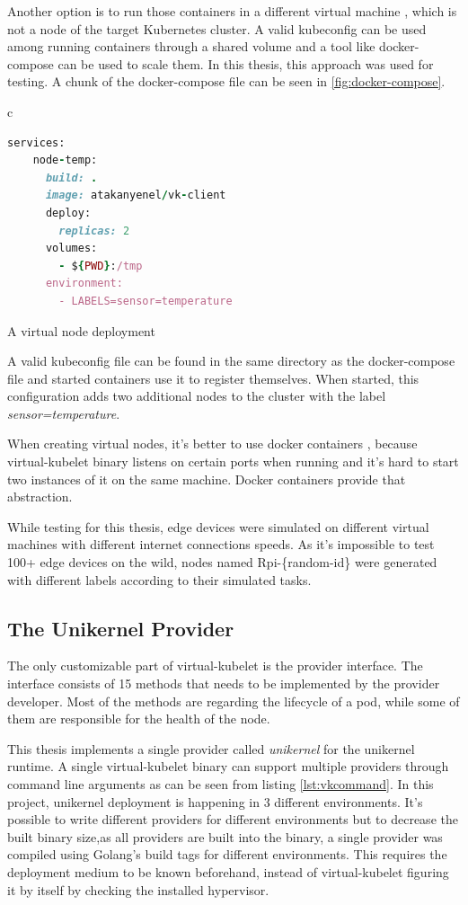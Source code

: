 Another option is to run those containers in a different virtual machine , which is not a node of the target Kubernetes cluster. A valid kubeconfig can be used among running containers through a shared volume and a tool like docker-compose can be used to scale them. In this thesis, this approach was used for testing. A chunk of the docker-compose file can be seen in \ref{fig:docker-compose}.

\begin{code}[htpb]
  \centering
  \begin{tabular}{c}
  \begin{lstlisting}[language=ruby]
    services:
    node-temp:
      build: .
      image: atakanyenel/vk-client
      deploy:
        replicas: 2
      volumes:
        - ${PWD}:/tmp
      environment:
        - LABELS=sensor=temperature
\end{lstlisting}
\end{tabular}
\caption{A virtual node deployment}\label{fig:docker-compose}
\end{code}


A valid kubeconfig file can be found in the same directory as the docker-compose file and started containers use it to register themselves. When started, this configuration adds two additional nodes to the cluster with the label \textit{sensor=temperature}.

When creating virtual nodes, it's better to use docker containers , because virtual-kubelet binary listens on certain ports when running and it's hard to start two instances of it on the same machine. Docker containers provide that abstraction.

While testing for this thesis, edge devices were simulated on different virtual machines with different internet connections speeds. As it's impossible to test 100+ edge devices on the wild, nodes named Rpi-\{random-id\} were generated with different labels according to their simulated tasks.

\subsection{The Unikernel Provider}
The only customizable part of virtual-kubelet is the provider interface. The interface consists of 15 methods that needs to be implemented by the provider developer. Most of the methods are regarding the lifecycle of a pod, while some of them are responsible for the health of the node. 

This thesis implements a single provider called \textit{unikernel} for the unikernel runtime. A single virtual-kubelet binary can support multiple providers through command line arguments as can be seen from listing \ref{lst:vkcommand}. In this project, unikernel deployment is happening in 3 different environments. It's possible to write different providers for different environments but to decrease the built binary size,as all providers are built into the binary, a single provider was compiled using Golang's build tags for different environments. This requires the deployment medium to be known beforehand, instead of virtual-kubelet figuring it by itself by checking the installed hypervisor.

